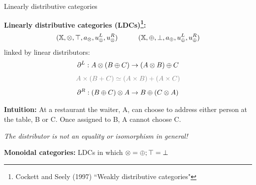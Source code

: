 \documentclass[aspectratio=169]{beamer}
\begin{document}
\fi

\begin{frame}{Linearly distributive categories}

 {\bf Linearly distributive categories (LDCs)\footnote{Cockett and Seely (1997) ``Weakly distributive categories"}:}
    \[
    (\mathbb{X}, \otimes, \top, a_\otimes, u_\otimes^L, u_\otimes^R) ~~~~~~~~~ (\mathbb{X}, \oplus, \bot, a_\oplus, u_\oplus^L, u_\oplus^R)
    \]  linked by {linear distributors}: 
    \[\partial^L: A \otimes (B \oplus C) \rightarrow  (A \otimes B) \oplus C \]
    \[  \textcolor{gray} {A \times (B + C) \simeq (A \times B) + (A \times C)} \]
    \[ \partial^R: (B \oplus C) \otimes A \rightarrow  B \oplus (C \otimes A) \]

    \textbf{Intuition:} At a restaurant the waiter, A, can choose to address either person at the table, B or C. Once assigned to B, A cannot choose C.

    \textit{The distributor is not an equality or isomorphism in general!}
        
    {\bf Monoidal categories:} LDCs in which $\otimes = \oplus; \top = \bot$ 

    \vspace{1em}
\end{frame}
\end{document}
